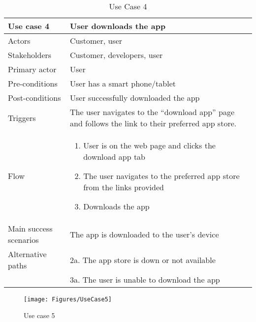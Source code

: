 \begin{table}[H]
\begin{tabular}{ | L{0.25\linewidth} | L{0.75\linewidth} | } 
 \hline {}
 Use case 4 & User downloads the app  \\ 
 \hline
 Actors & Customer, user \\ 
 \hline
 Stakeholders & Customer, developers, user \\ 
  \hline
 Primary actor & User  \\ 
 \hline
 Pre-conditions & User has a smart phone/tablet \\ 
 \hline
 Post-conditions & User successfully downloaded the app \\ 
  \hline
 Triggers & The user navigates to the “download app” page and follows the link to their preferred app store.  \\ 
 \hline
Flow & \begin{minipage}{5in}
    \vskip 1pt
    \begin{enumerate}
  \item User is on the web page and clicks the download app tab
  \item The user navigates to the preferred app store from the links provided
  \item Downloads the app
   \end{enumerate}
   \vskip 4pt
 \end{minipage}\\ 
 \hline
 Main success scenarios & The app is downloaded to the user’s device \\ 
 \hline
 Alternative paths & 2a. The app store is down or not available \\
 & 3a. The user is unable to download the app\\
 \hline
\end{tabular}
\caption{Use Case 4}
\end{table}

\begin{figure}[H]
\centering
\texttt{[image: Figures/UseCase5]}
\caption{Use case 5}
    \label{fig:UC5}
    \end{figure}

